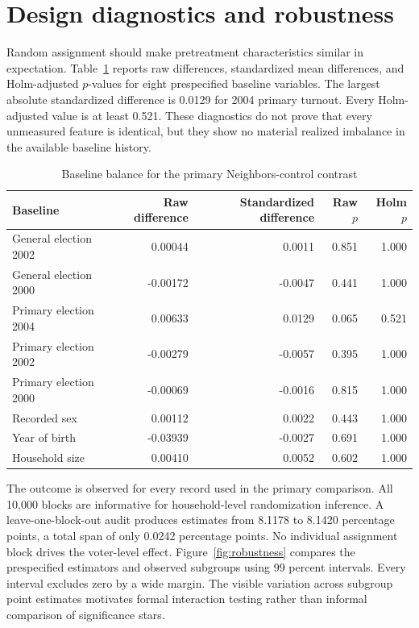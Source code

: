\documentclass[a4paper,12pt]{article}
\begin{document}
\section{Design diagnostics and robustness}

Random assignment should make pretreatment characteristics similar in expectation. Table~\ref{tab:balance} reports raw differences, standardized mean differences, and Holm-adjusted $p$-values for eight prespecified baseline variables. The largest absolute standardized difference is 0.0129 for 2004 primary turnout. Every Holm-adjusted value is at least 0.521. These diagnostics do not prove that every unmeasured feature is identical, but they show no material realized imbalance in the available baseline history.

\begin{table}[H]
\centering
\caption{Baseline balance for the primary Neighbors-control contrast}
\label{tab:balance}
\small
\setlength{\tabcolsep}{7pt}
\begin{tabular}{lrrrr}
\toprule
Baseline & Raw difference & Standardized difference & Raw $p$ & Holm $p$ \\
\midrule
General election 2002 & 0.00044 & 0.0011 & 0.851 & 1.000 \\
General election 2000 & -0.00172 & -0.0047 & 0.441 & 1.000 \\
Primary election 2004 & 0.00633 & 0.0129 & 0.065 & 0.521 \\
Primary election 2002 & -0.00279 & -0.0057 & 0.395 & 1.000 \\
Primary election 2000 & -0.00069 & -0.0016 & 0.815 & 1.000 \\
Recorded sex & 0.00112 & 0.0022 & 0.443 & 1.000 \\
Year of birth & -0.03939 & -0.0027 & 0.691 & 1.000 \\
Household size & 0.00410 & 0.0052 & 0.602 & 1.000 \\
\bottomrule
\end{tabular}
\end{table}

The outcome is observed for every record used in the primary comparison. All 10,000 blocks are informative for household-level randomization inference. A leave-one-block-out audit produces estimates from 8.1178 to 8.1420 percentage points, a total span of only 0.0242 percentage points. No individual assignment block drives the voter-level effect. Figure~\ref{fig:robustness} compares the prespecified estimators and observed subgroups using 99 percent intervals. Every interval excludes zero by a wide margin. The visible variation across subgroup point estimates motivates formal interaction testing rather than informal comparison of significance stars.
\end{document}
